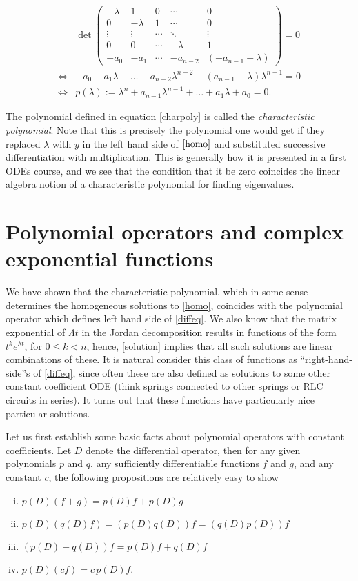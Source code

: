 \documentclass{homework} %
\begin{document}
\begin{align}
  &\det\begin{pmatrix}
    -\lambda & 1 & 0 & \cdots & 0 \\
    0 & -\lambda & 1 & \cdots & 0 \\
    \vdots & \vdots & \cdots & \ddots & \vdots \\
    0 & 0 & \cdots & -\lambda & 1\\
    -a_0 & -a_1 & \cdots & -a_{n-2} & (-a_{n-1}-\lambda)
  \end{pmatrix} = 0 \nonumber\\
  \iff&
  -a_0 -a_1\lambda - \dots - a_{n-2}\lambda^{n-2} - (a_{n-1} -\lambda)\lambda^{n-1} = 0 \nonumber\\
  \iff&p(\lambda) := \lambda^n + a_{n-1}\lambda^{n-1} + \dots + a_1 \lambda + a_0 = 0. \label{charpoly}
\end{align}

The polynomial defined in equation \eqref{charpoly} is called the
\emph{characteristic polynomial}.  Note that this is precisely the polynomial
one would get if they replaced $\lambda$ with $y$ in the left hand side of
$\eqref{homo}$ and substituted successive differentiation with multiplication.
This is generally how it is presented in a first ODEs course, and we see that the condition that it be zero
 coincides the linear algebra notion of a characteristic polynomial for finding eigenvalues.   

\section{Polynomial operators and complex exponential functions}

We have shown that the characteristic polynomial, which in some sense determines
the homogeneous solutions to \eqref{homo}, coincides with the polynomial
operator which defines left hand side of \eqref{diffeq}.  We also know that the
matrix exponential of $\Lambda t$ in the Jordan decomposition results in
functions of the form $t^k e^{\lambda t}$, for $0\le k < n$, hence,
\eqref{solution} implies that all such solutions are linear combinations of
these.  It is natural consider this class of functions as ``right-hand-side''s
of \eqref{diffeq}, since often these are also defined as solutions to some other constant coefficient ODE
(think springs connected to other springs or RLC circuits in series).  It turns out
that these functions have particularly nice particular solutions.

Let us first establish some basic facts about polynomial operators with
constant coefficients. Let $D$ denote the differential operator, then for any
given polynomials $p$ and $q$, any sufficiently differentiable functions $f$
and $g$, and any constant $c$, the following propositions are relatively easy to show 
\begin{enumerate}[(i)] 
\item $p(D)(f + g) = p(D)f + p(D)g$
\item $p(D)(q(D)f) = (p(D)q(D)) f = (q(D)p(D)) f$
\item $(p(D) + q(D))f = p(D)f + q(D)f$
\item $p(D)(cf) = c\,p(D) f$.
\end{enumerate}
\end{document}
